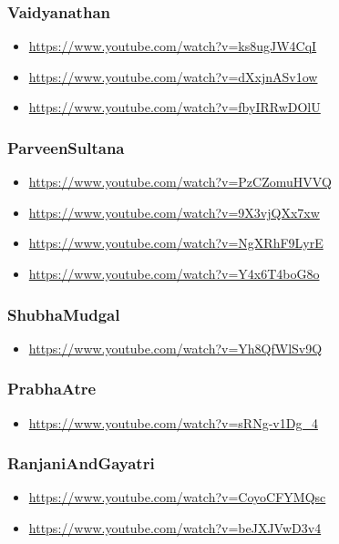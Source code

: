 \subsubsection{Vaidyanathan}
\label{sec:orga8ba2c4}
\begin{itemize}
\item \url{https://www.youtube.com/watch?v=ks8ugJW4CqI}
\item \url{https://www.youtube.com/watch?v=dXxjnASv1ow}
\item \url{https://www.youtube.com/watch?v=fbyIRRwDOlU}
\end{itemize}

\subsubsection{ParveenSultana}
\label{sec:org045251f}
\begin{itemize}
\item \url{https://www.youtube.com/watch?v=PzCZomuHVVQ}
\item \url{https://www.youtube.com/watch?v=9X3vjQXx7xw}
\item \url{https://www.youtube.com/watch?v=NgXRhF9LyrE}
\item \url{https://www.youtube.com/watch?v=Y4x6T4boG8o}
\end{itemize}

\subsubsection{ShubhaMudgal}
\label{sec:org7a276f9}
\begin{itemize}
\item \url{https://www.youtube.com/watch?v=Yh8QfWlSv9Q}
\end{itemize}

\subsubsection{PrabhaAtre}
\label{sec:org6f850b9}
\begin{itemize}
\item \url{https://www.youtube.com/watch?v=sRNg-v1Dg\_4}
\end{itemize}

\subsubsection{RanjaniAndGayatri}
\label{sec:org64fab0b}
\begin{itemize}
\item \url{https://www.youtube.com/watch?v=CoyoCFYMQsc}
\item \url{https://www.youtube.com/watch?v=beJXJVwD3v4}
\end{itemize}


